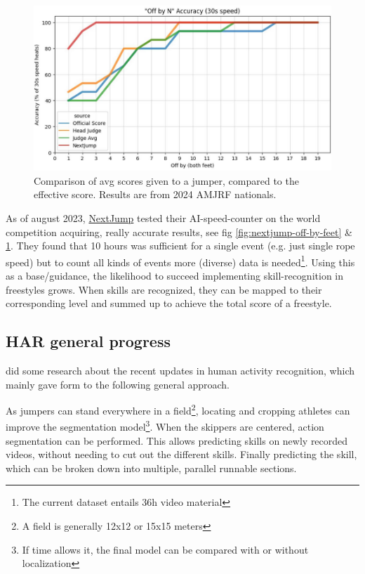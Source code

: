 \begin{figure}
    \centering
    \includegraphics[width=0.95\linewidth]{img/nextjump-off-by-feet-judges}
    \caption[nextjump-results-multi]{Comparison of avg scores given to a jumper, compared to the effective score. Results are from 2024 AMJRF nationals.}
    \label{fig:nextjump-off-by-feet-judges}
\end{figure}

As of august 2023, \href{https://nextjump.app/}{NextJump} tested their AI-speed-counter on the world competition acquiring, really accurate results, see fig \ref{fig:nextjump-off-by-feet} \& \ref{fig:nextjump-off-by-feet-judges}. They found that 10 hours was sufficient for a single event (e.g. just single rope speed) but to count all kinds of events more (diverse) data is needed\footnote{The current dataset entails 36h video material}. Using this as a base/guidance, the likelihood to succeed implementing skill-recognition in freestyles grows.
When skills are recognized, they can be mapped to their corresponding level and summed up to achieve the total score of a freestyle.


\subsection{HAR general progress}

\textcite{Pareek_2020} did some research about the recent updates in human activity recognition, which mainly gave form to the following general approach.

As jumpers can stand everywhere in a field\footnote{A field is generally 12x12 or 15x15 meters}, locating and cropping athletes can improve the segmentation model\footnote{If time allows it, the final model can be compared with or without localization}. When the skippers are centered, action segmentation can be performed. This allows predicting skills on newly recorded videos, without needing to cut out the different skills. Finally predicting the skill, which can be broken down into multiple, parallel runnable sections.

